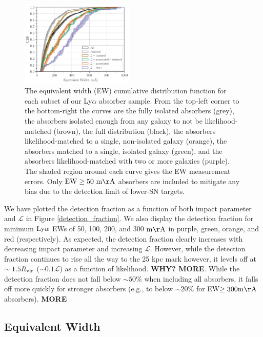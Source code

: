 \documentclass[twocolumn,tighten]{aastex62}
\begin{document}
\begin{figure}[ht!]
        \centering
        \vspace{15pt}
        \includegraphics[width=0.48\textwidth]{hist(EW)_bins10_6_EWcut50-15000_err_dataset_double.pdf}
        \caption{\small{The equivalent width (EW) cumulative distribution function for each subset of our Ly$\alpha$ absorber sample. From the top-left corner to the bottom-right the curves are the fully isolated absorbers (grey), the absorbers isolated enough from any galaxy to not be likelihood-matched (brown), the full distribution (black), the absorbers likelihood-matched to a single, non-isolated galaxy (orange), the absorbers matched to a single, isolated galaxy (green), and the absorbers likelihood-matched with two or more galaxies (purple). The shaded region around each curve gives the EW measurement errors. Only $\rm EW \ge 50~m\AA$ absorbers are included to mitigate any bias due to the detection limit of lower-SN targets.}}
        \vspace{0pt}
        \label{cdf_ew}
\end{figure}


We have plotted the detection fraction as a function of both impact parameter and $\mathcal{L}$ in Figure \ref{detection_fraction}. We also display the detection fraction for minimum $\rm Ly\alpha$ EWs of 50, 100, 200, and 300 $\rm m\AA$ in purple, green, orange, and red (respectively). As expected, the detection fraction clearly increases with decreasing impact parameter and increasing $\mathcal{L}$. However, while the detection fraction continues to rise all the way to the 25 kpc mark however, it levels off at $\sim 1.5 R_{\rm vir}$ ($\sim 0.1 \mathcal{L}$) as a function of likelihood. \textbf{WHY? MORE}. While the detection fraction does not fall below $\sim 50\%$ when including all absorbers, it falls off more quickly for stronger absorbers (e.g., to below $\sim 20\%$ for EW$\rm \ge 300 m\AA$ absorbers). \textbf{MORE}



\subsection{Equivalent Width}
\end{document}
